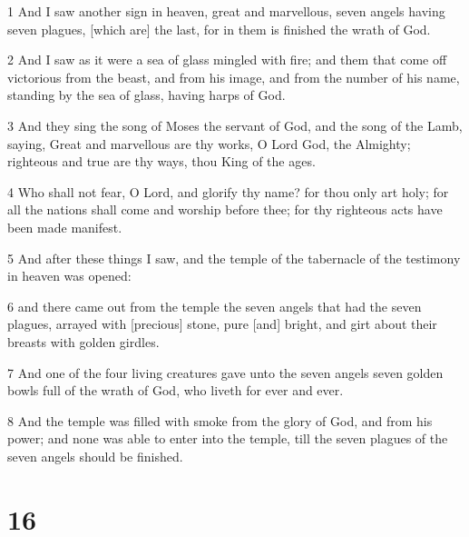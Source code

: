 \par 1 And I saw another sign in heaven, great and marvellous, seven angels having seven plagues, [which are] the last, for in them is finished the wrath of God.
\par 2 And I saw as it were a sea of glass mingled with fire; and them that come off victorious from the beast, and from his image, and from the number of his name, standing by the sea of glass, having harps of God.
\par 3 And they sing the song of Moses the servant of God, and the song of the Lamb, saying, Great and marvellous are thy works, O Lord God, the Almighty; righteous and true are thy ways, thou King of the ages.
\par 4 Who shall not fear, O Lord, and glorify thy name? for thou only art holy; for all the nations shall come and worship before thee; for thy righteous acts have been made manifest.
\par 5 And after these things I saw, and the temple of the tabernacle of the testimony in heaven was opened:
\par 6 and there came out from the temple the seven angels that had the seven plagues, arrayed with [precious] stone, pure [and] bright, and girt about their breasts with golden girdles.
\par 7 And one of the four living creatures gave unto the seven angels seven golden bowls full of the wrath of God, who liveth for ever and ever.
\par 8 And the temple was filled with smoke from the glory of God, and from his power; and none was able to enter into the temple, till the seven plagues of the seven angels should be finished.

\chapter{16}

